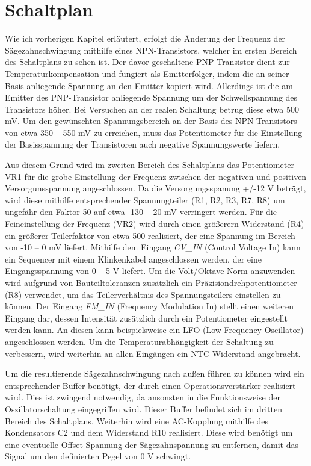 \section{Schaltplan}
Wie ich vorherigen Kapitel erläutert, erfolgt die Änderung der Frequenz der Sägezahnschwingung mithilfe eines NPN-Transistors, welcher im ersten Bereich des Schaltplans zu sehen ist. 
Der davor geschaltene PNP-Transistor dient zur Temperaturkompensation und fungiert als Emitterfolger, indem die an seiner Basis anliegende Spannung an den Emitter kopiert wird.
Allerdings ist die am Emitter des PNP-Transistor anliegende Spannung um der Schwellspannung des Transistors höher.
Bei Versuchen an der realen Schaltung betrug diese etwa 500 mV.
Um den gewünschten Spannungsbereich an der Basis des NPN-Transistors von etwa 350 -- 550 mV zu erreichen, muss das Potentiometer für die Einstellung der Basisspannung der Transistoren auch negative Spannungswerte liefern.

Aus diesem Grund wird im zweiten Bereich des Schaltplans das Potentiometer VR1 für die grobe Einstellung der Frequenz zwischen der negativen und positiven Versorgunsspannung angeschlossen.
Da die Versorgungsspanung +/-12 V beträgt, wird diese mithilfe entsprechender Spannungteiler (R1, R2, R3, R7, R8)  um ungefähr den Faktor 50 auf etwa -130 -- 20 mV verringert werden.
Für die Feineinstellung der Frequenz (VR2) wird durch einen größerern Widerstand (R4) ein größerer Teilerfaktor von etwa 500 realisiert, der eine Spannung im Bereich von -10 -- 0 mV liefert.
Mithilfe dem Eingang \textit{CV\_IN} (Control Voltage In) kann ein Sequencer mit einem Klinkenkabel angeschlossen werden, der eine Eingangsspannung von 0 -- 5 V liefert.
Um die Volt/Oktave-Norm anzuwenden wird aufgrund von Bauteiltoleranzen zusätzlich ein Präzisiondrehpotentiometer (R8) verwendet, um das Teilerverhältnis des Spannungsteilers einstellen zu können.
Der Eingang \textit{FM\_IN} (Frequency Modulation In) stellt einen weiteren Eingang dar, dessen Intensität zusätzlich durch ein Potentiometer eingestellt werden kann. 
An diesen kann beispielsweise ein LFO (Low Frequency Oscillator) angeschlossen werden.
Um die Temperaturabhängigkeit der Schaltung zu verbessern, wird weiterhin an allen Eingängen ein NTC-Widerstand angebracht.

Um die resultierende Sägezahnschwingung nach außen führen zu können wird ein entsprechender Buffer benötigt, der durch einen Operationsverstärker realisiert wird.
Dies ist zwingend notwendig, da ansonsten in die Funktionsweise der Oszillatorschaltung eingegriffen wird. 
Dieser Buffer befindet sich im dritten Bereich des Schaltplans.
Weiterhin wird eine AC-Kopplung mithilfe des Kondensators C2 und dem Widerstand R10 realisiert. 
Diese wird benötigt um eine eventuelle Offset-Spannung der Sägezahnspannung zu entfernen, damit das Signal um den definierten Pegel von 0 V schwingt.

